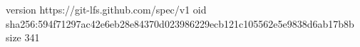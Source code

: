 version https://git-lfs.github.com/spec/v1
oid sha256:594f71297ac42e6eb28e84370d023986229ecb121c105562e5e9838d6ab17b8b
size 341

